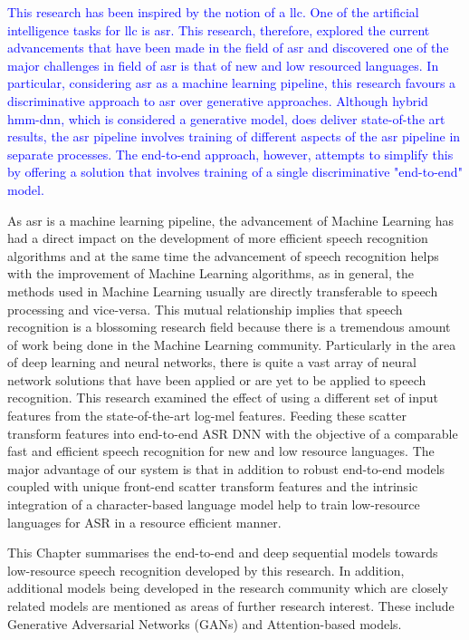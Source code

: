 \textcolor{blue}{This research has been inspired by the notion of a \acrfull{llc}. One of the artificial intelligence tasks for \acrshort{llc} is \acrfull{asr}.  This research, therefore, explored the current advancements that have been made in the field of \acrshort{asr} and discovered one of the major challenges in field of \acrshort{asr} is that of new and low resourced languages.  In particular, considering \acrshort{asr} as a machine learning pipeline, this research favours a discriminative approach to \acrshort{asr} over generative approaches.  Although hybrid \acrshort{hmm}-\acrshort{dnn}, which is considered a generative model, does deliver state-of-the art results, the \acrshort{asr} pipeline involves training of different aspects of the \acrshort{asr} pipeline in separate processes.  The end-to-end approach, however, attempts to simplify this by offering a solution that involves training of a single discriminative "end-to-end" model. }

\startblue
As \acrshort{asr} is a machine learning pipeline,  the advancement of Machine Learning has had a direct impact on the development of more efficient speech recognition algorithms and at the same time the advancement of speech recognition helps with the improvement of Machine Learning algorithms, as in general, the methods used in Machine Learning usually are directly transferable to speech processing and vice-versa. This mutual relationship implies that speech recognition is a blossoming research field because there is a tremendous amount of work being done in the Machine Learning community. Particularly in the area of deep learning and neural networks, there is quite a vast array of neural network solutions that have been applied or are yet to be applied to speech recognition. This research examined the effect of using a different set of input features from the state-of-the-art log-mel features. Feeding these scatter transform features into end-to-end ASR DNN with the objective of a comparable fast and efficient speech recognition for new and low resource languages. The major advantage of our system is that in addition to robust end-to-end models coupled with unique front-end scatter transform features and the intrinsic integration of a character-based language model help to train low-resource languages for ASR in a resource efficient manner. 

This Chapter summarises the end-to-end and deep sequential models towards low-resource speech recognition developed by this research. In addition, additional models being developed in the research community which are closely related models are mentioned as areas of further research interest.  These include Generative Adversarial Networks (GANs) and Attention-based models. 


